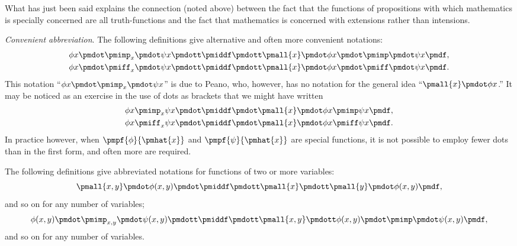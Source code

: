 \documentclass[letterpaper,12pt,openany,leqno]{book}
\newcommand{\pagefirst}[1]{\marginnote[\boxed{\text{#1}}]{\boxed{\text{#1}}}}
\begin{document}
What has just been said explains the connection (noted above) between the fact that the functions of propositions with which mathematics is specially \pagefirst{23} concerned are all truth-functions and the fact that mathematics is concerned with extensions rather than intensions.

\textit{Convenient abbreviation}. The following definitions give alternative and often more convenient notations:
\begin{align*}
	\phi x \pmdot \pmimp_x \pmdot \psi x \pmdott \pmiddf  \pmdott \pmall{x}\pmdot\phi x\pmdot \pmimp \pmdot \psi x \pmdf, \\
	\phi x \pmdot \pmiff_x \pmdot \psi x \pmdott \pmiddf \pmdott \pmall{x}\pmdot\phi x\pmdot \pmiff \pmdot \psi x \pmdf.
\end{align*}
This notation ``$\phi x \pmdot \pmimp_x \pmdot \psi x$'' is due to Peano, who, however, has no notation for the general idea ``$\pmall{x}\pmdot \phi x$.'' It may be noticed as an exercise in the use of dots as brackets that we might have written 
\begin{align*}
	\phi x \pmimp_x \psi x \pmdot \pmiddf \pmdot \pmall{x}\pmdot\phi x \pmimp \psi x \pmdf, \\
	\phi x \pmiff_x \psi x \pmdot \pmiddf \pmdot \pmall{x}\pmdot\phi x \pmiff  \psi x \pmdf.
\end{align*}
In practice however, when $\pmpf{\phi}{\pmhat{x}}$ and $\pmpf{\psi}{\pmhat{x}}$ are special functions, it is not possible to employ fewer dots than in the first form, and often more are required. 

The following definitions give abbreviated notations for functions of two or more variables:
\[
	\pmall{x, y} \pmdot \phi(x,y) \pmdot \pmiddf \pmdott \pmall{x} \pmdott \pmall{y} \pmdot \phi(x,y) \pmdf,
\]
and so on for any number of variables;
\[
	\phi(x,y) \pmdot \pmimp_{x,y} \pmdot \psi(x,y) \pmdott \pmiddf \pmdott \pmall{x, y} \pmdott \phi(x,y) \pmdot \pmimp \pmdot \psi(x,y) \pmdf,
\]
and so on for any number of variables.
\end{document}
